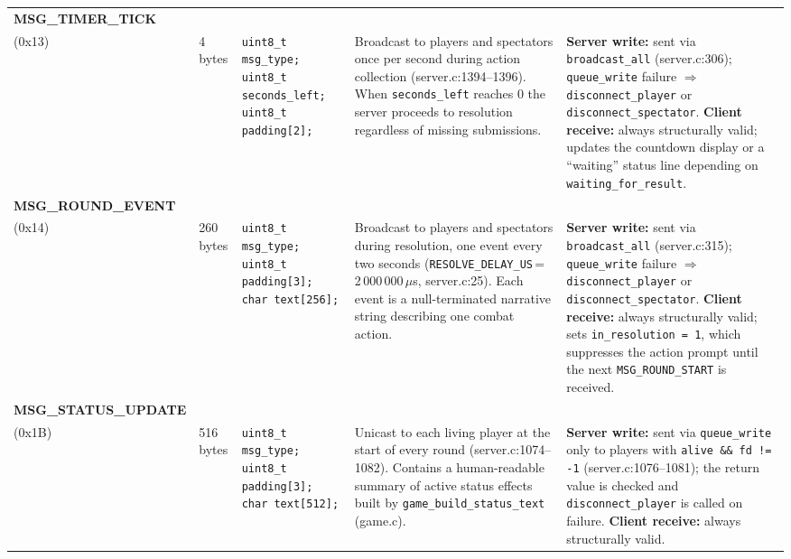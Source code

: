 \documentclass[11pt,letterpaper]{article}
\begin{document}
\begin{longtable}{@{}p{1.8cm} p{1.2cm} p{2.4cm} p{4.2cm} p{4.8cm}@{}}
\textbf{MSG\_TIMER\_TICK}\\(0x13) &
4 bytes &
\texttt{uint8\_t msg\_type;}\newline
\texttt{uint8\_t seconds\_left;}\newline
\texttt{uint8\_t padding[2];} &
Broadcast to players and spectators once per second during action collection (server.c:1394--1396). When \texttt{seconds\_left} reaches 0 the server proceeds to resolution regardless of missing submissions. &
\textbf{Server write:} sent via \texttt{broadcast\_all} (server.c:306); \texttt{queue\_write} failure $\Rightarrow$ \texttt{disconnect\_player} or \texttt{disconnect\_spectator}. \textbf{Client receive:} always structurally valid; updates the countdown display or a ``waiting'' status line depending on \texttt{waiting\_for\_result}. \\[4pt]

\textbf{MSG\_ROUND\_EVENT}\\(0x14) &
260 bytes &
\texttt{uint8\_t msg\_type;}\newline
\texttt{uint8\_t padding[3];}\newline
\texttt{char text[256];} &
Broadcast to players and spectators during resolution, one event every two seconds (\texttt{RESOLVE\_DELAY\_US}\,=\,2\,000\,000\,$\mu$s, server.c:25). Each event is a null-terminated narrative string describing one combat action. &
\textbf{Server write:} sent via \texttt{broadcast\_all} (server.c:315); \texttt{queue\_write} failure $\Rightarrow$ \texttt{disconnect\_player} or \texttt{disconnect\_spectator}. \textbf{Client receive:} always structurally valid; sets \texttt{in\_resolution = 1}, which suppresses the action prompt until the next \texttt{MSG\_ROUND\_START} is received. \\[4pt]
\newpage

\textbf{MSG\_STATUS\_UPDATE}\\(0x1B) &
516 bytes &
\texttt{uint8\_t msg\_type;}\newline
\texttt{uint8\_t padding[3];}\newline
\texttt{char text[512];} &
Unicast to each living player at the start of every round (server.c:1074--1082). Contains a human-readable summary of active status effects built by \texttt{game\_build\_status\_text} (game.c). &
\textbf{Server write:} sent via \texttt{queue\_write} only to players with \texttt{alive \&\& fd != -1} (server.c:1076--1081); the return value is checked and \texttt{disconnect\_player} is called on failure. \textbf{Client receive:} always structurally valid. \\[4pt]


\end{longtable}
\end{document}
